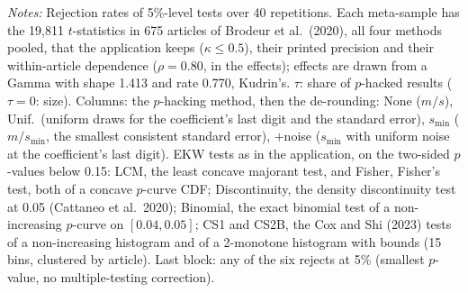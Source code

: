 \begin{table}[htbp]
\begin{minipage}{\linewidth}\footnotesize\textit{Notes:} Rejection rates of 5\%-level tests over 40 repetitions. Each meta-sample has the 19{,}811 $t$-statistics in 675 articles of Brodeur et al.\ (2020), all four methods pooled, that the application keeps ($\kappa \le 0.5$), their printed precision and their within-article dependence ($\rho = 0.80$, in the effects); effects are drawn from a Gamma with shape 1.413 and rate 0.770, Kudrin's. $\tau$: share of $p$-hacked results ($\tau = 0$: size). Columns: the $p$-hacking method, then the de-rounding: None ($m/s$), Unif.\ (uniform draws for the coefficient's last digit and the standard error), $s_{\min}$ ($m/s_{\min}$, the smallest consistent standard error), $+$noise ($s_{\min}$ with uniform noise at the coefficient's last digit). EKW tests as in the application, on the two-sided $p$-values below 0.15: LCM, the least concave majorant test, and Fisher, Fisher's test, both of a concave $p$-curve CDF; Discontinuity, the density discontinuity test at 0.05 (Cattaneo et al.\ 2020); Binomial, the exact binomial test of a non-increasing $p$-curve on $[0.04, 0.05]$; CS1 and CS2B, the Cox and Shi (2023) tests of a non-increasing histogram and of a 2-monotone histogram with bounds (15 bins, clustered by article). Last block: any of the six rejects at 5\% (smallest $p$-value, no multiple-testing correction).\end{minipage}
\end{table}
